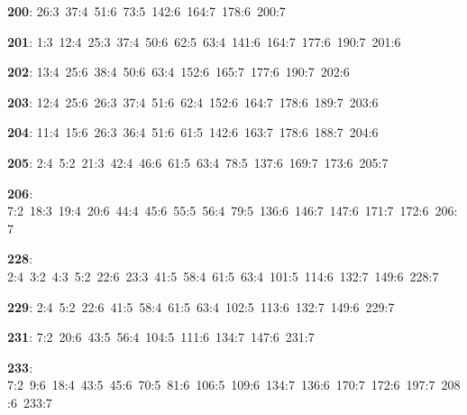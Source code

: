 \noindent \textbf{200}: 26:3\allowbreak\ 37:4\allowbreak\ 51:6\allowbreak\ 73:5\allowbreak\ 142:6\allowbreak\ 164:7\allowbreak\ 178:6\allowbreak\ 200:7\par
\noindent \textbf{201}: 1:3\allowbreak\ 12:4\allowbreak\ 25:3\allowbreak\ 37:4\allowbreak\ 50:6\allowbreak\ 62:5\allowbreak\ 63:4\allowbreak\ 141:6\allowbreak\ 164:7\allowbreak\ 177:6\allowbreak\ 190:7\allowbreak\ 201:6\par
\noindent \textbf{202}: 13:4\allowbreak\ 25:6\allowbreak\ 38:4\allowbreak\ 50:6\allowbreak\ 63:4\allowbreak\ 152:6\allowbreak\ 165:7\allowbreak\ 177:6\allowbreak\ 190:7\allowbreak\ 202:6\par
\noindent \textbf{203}: 12:4\allowbreak\ 25:6\allowbreak\ 26:3\allowbreak\ 37:4\allowbreak\ 51:6\allowbreak\ 62:4\allowbreak\ 152:6\allowbreak\ 164:7\allowbreak\ 178:6\allowbreak\ 189:7\allowbreak\ 203:6\par
\noindent \textbf{204}: 11:4\allowbreak\ 15:6\allowbreak\ 26:3\allowbreak\ 36:4\allowbreak\ 51:6\allowbreak\ 61:5\allowbreak\ 142:6\allowbreak\ 163:7\allowbreak\ 178:6\allowbreak\ 188:7\allowbreak\ 204:6\par
\noindent \textbf{205}: 2:4\allowbreak\ 5:2\allowbreak\ 21:3\allowbreak\ 42:4\allowbreak\ 46:6\allowbreak\ 61:5\allowbreak\ 63:4\allowbreak\ 78:5\allowbreak\ 137:6\allowbreak\ 169:7\allowbreak\ 173:6\allowbreak\ 205:7\par
\noindent \textbf{206}: 7:2\allowbreak\ 18:3\allowbreak\ 19:4\allowbreak\ 20:6\allowbreak\ 44:4\allowbreak\ 45:6\allowbreak\ 55:5\allowbreak\ 56:4\allowbreak\ 79:5\allowbreak\ 136:6\allowbreak\ 146:7\allowbreak\ 147:6\allowbreak\ 171:7\allowbreak\ 172:6\allowbreak\ 206:7\par
\noindent \textbf{228}: 2:4\allowbreak\ 3:2\allowbreak\ 4:3\allowbreak\ 5:2\allowbreak\ 22:6\allowbreak\ 23:3\allowbreak\ 41:5\allowbreak\ 58:4\allowbreak\ 61:5\allowbreak\ 63:4\allowbreak\ 101:5\allowbreak\ 114:6\allowbreak\ 132:7\allowbreak\ 149:6\allowbreak\ 228:7\par
\noindent \textbf{229}: 2:4\allowbreak\ 5:2\allowbreak\ 22:6\allowbreak\ 41:5\allowbreak\ 58:4\allowbreak\ 61:5\allowbreak\ 63:4\allowbreak\ 102:5\allowbreak\ 113:6\allowbreak\ 132:7\allowbreak\ 149:6\allowbreak\ 229:7\par
\noindent \textbf{231}: 7:2\allowbreak\ 20:6\allowbreak\ 43:5\allowbreak\ 56:4\allowbreak\ 104:5\allowbreak\ 111:6\allowbreak\ 134:7\allowbreak\ 147:6\allowbreak\ 231:7\par
\noindent \textbf{233}: 7:2\allowbreak\ 9:6\allowbreak\ 18:4\allowbreak\ 43:5\allowbreak\ 45:6\allowbreak\ 70:5\allowbreak\ 81:6\allowbreak\ 106:5\allowbreak\ 109:6\allowbreak\ 134:7\allowbreak\ 136:6\allowbreak\ 170:7\allowbreak\ 172:6\allowbreak\ 197:7\allowbreak\ 208:6\allowbreak\ 233:7\par
